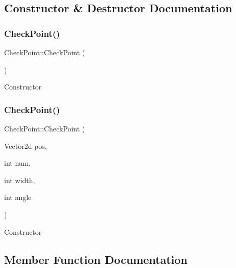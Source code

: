 \subsection{Constructor \& Destructor Documentation}
\hypertarget{classCheckPoint_a78e714da90f33a69c0413a2f51a988ad}{}\label{classCheckPoint_a78e714da90f33a69c0413a2f51a988ad} 
\subsubsection{\texorpdfstring{Check\+Point()}{CheckPoint()}\hspace{0.1cm}{\footnotesize\ttfamily [1/2]}}
{\footnotesize\ttfamily Check\+Point\+::\+Check\+Point (\begin{DoxyParamCaption}{ }\end{DoxyParamCaption})\hspace{0.3cm}{\ttfamily [inline]}}

Constructor \hypertarget{classCheckPoint_a17653df57b3208932c20fceecf29e7a1}{}\label{classCheckPoint_a17653df57b3208932c20fceecf29e7a1} 
\subsubsection{\texorpdfstring{Check\+Point()}{CheckPoint()}\hspace{0.1cm}{\footnotesize\ttfamily [2/2]}}
{\footnotesize\ttfamily Check\+Point\+::\+Check\+Point (\begin{DoxyParamCaption}\item[{Vector2d}]{pos,  }\item[{int}]{num,  }\item[{int}]{width,  }\item[{int}]{angle }\end{DoxyParamCaption})}

Constructor 

\subsection{Member Function Documentation}
\hypertarget{classCheckPoint_abb225b6849ff500b0fe19cdeb927d1b6}{}\label{classCheckPoint_abb225b6849ff500b0fe19cdeb927d1b6} 
